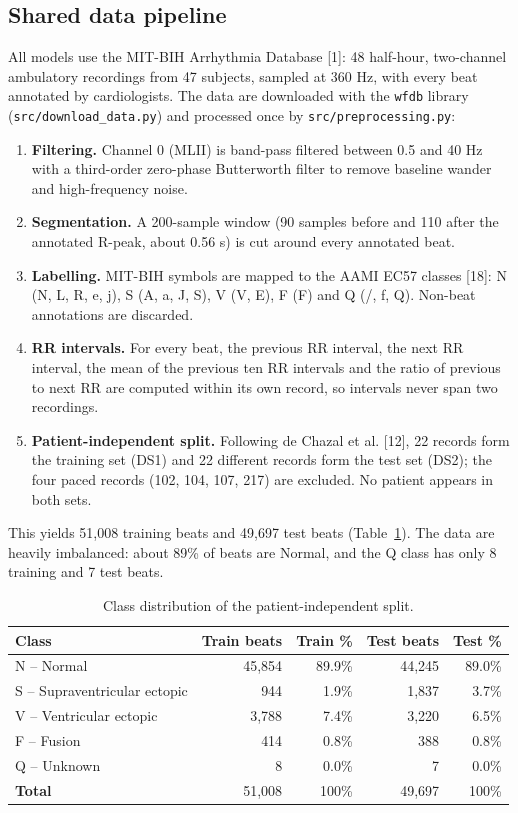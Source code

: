 \documentclass[11pt,a4paper]{article}
\begin{document}
\subsection{Shared data pipeline}
All models use the MIT-BIH Arrhythmia Database [1]: 48 half-hour, two-channel ambulatory recordings from 47 subjects, sampled at 360 Hz, with every beat annotated by cardiologists. The data are downloaded with the \texttt{wfdb} library (\texttt{src/download\_data.py}) and processed once by \texttt{src/preprocessing.py}:
\begin{enumerate}
\item \textbf{Filtering.} Channel 0 (MLII) is band-pass filtered between 0.5 and 40 Hz with a third-order zero-phase Butterworth filter to remove baseline wander and high-frequency noise.
\item \textbf{Segmentation.} A 200-sample window (90 samples before and 110 after the annotated R-peak, about 0.56 s) is cut around every annotated beat.
\item \textbf{Labelling.} MIT-BIH symbols are mapped to the AAMI EC57 classes [18]: N (N, L, R, e, j), S (A, a, J, S), V (V, E), F (F) and Q (/, f, Q). Non-beat annotations are discarded.
\item \textbf{RR intervals.} For every beat, the previous RR interval, the next RR interval, the mean of the previous ten RR intervals and the ratio of previous to next RR are computed within its own record, so intervals never span two recordings.
\item \textbf{Patient-independent split.} Following de Chazal et al. [12], 22 records form the training set (DS1) and 22 different records form the test set (DS2); the four paced records (102, 104, 107, 217) are excluded. No patient appears in both sets.
\end{enumerate}
This yields 51,008 training beats and 49,697 test beats (Table~\ref{tab:dist}). The data are heavily imbalanced: about 89\% of beats are Normal, and the Q class has only 8 training and 7 test beats.

\begin{table}[H]
\centering\small
\caption{Class distribution of the patient-independent split.}\label{tab:dist}
\begin{tabular}{lrrrr}
\toprule
\textbf{Class} & \textbf{Train beats} & \textbf{Train \%} & \textbf{Test beats} & \textbf{Test \%} \\
\midrule
N -- Normal & 45,854 & 89.9\% & 44,245 & 89.0\% \\
S -- Supraventricular ectopic & 944 & 1.9\% & 1,837 & 3.7\% \\
V -- Ventricular ectopic & 3,788 & 7.4\% & 3,220 & 6.5\% \\
F -- Fusion & 414 & 0.8\% & 388 & 0.8\% \\
Q -- Unknown & 8 & 0.0\% & 7 & 0.0\% \\
\textbf{Total} & 51,008 & 100\% & 49,697 & 100\% \\
\bottomrule
\end{tabular}
\end{table}
\end{document}
